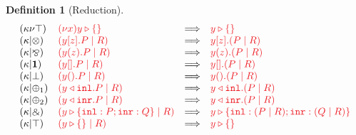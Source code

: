 \documentclass[draft,submission,copyright,creativecommons]{eptcs}
\newtheorem{definition}{Definition}
\begin{document}
\begin{definition}[Reduction]
\[\begin{array}{llcll}
      \hccpRedKappaNuTop
      & \tm{\piNew{x}{\cpAbsurd{y}}}
      & \Longrightarrow
      & \tm{\cpAbsurd{y}}
      \\
      \hccpRedKappaMixTens
      & \tm{(\piPar{\piBoundSend{y}{z}{P}}{R})}
      & \Longrightarrow
      & \tm{\piBoundSend{y}{z}{(\piPar{P}{R})}}
      \\
      \hccpRedKappaMixParr
      & \tm{(\piPar{\piRecv{y}{z}{P}}{R})}
      & \Longrightarrow
      & \tm{\piRecv{y}{z}{(\piPar{P}{R})}}
      \\
      \hccpRedKappaMixOne
      & \tm{(\piPar{\piBoundSend{y}{}{P}}{R})}
      & \Longrightarrow
      & \tm{\piBoundSend{y}{}{(\piPar{P}{R})}}
      \\
      \hccpRedKappaMixBot
      & \tm{(\piPar{\piRecv{y}{}{P}}{R})}
      & \Longrightarrow
      & \tm{\piRecv{y}{}{(\piPar{P}{R})}}
      \\
      \hccpRedKappaMixPlus1
      & \tm{(\piPar{\cpInl{y}{P}}{R})}
      & \Longrightarrow
      & \tm{\cpInl{y}{(\piPar{P}{R})}}
      \\
      \hccpRedKappaMixPlus2
      & \tm{(\piPar{\cpInr{y}{P}}{R})}
      & \Longrightarrow
      & \tm{\cpInr{y}{(\piPar{P}{R})}}
      \\
      \hccpRedKappaMixWith
      & \tm{(\piPar{\cpCase{y}{P}{Q}}{R})}
      & \Longrightarrow
      & \tm{\cpCase{y}{(\piPar{P}{R})}{(\piPar{Q}{R})}}
      \\
      \hccpRedKappaMixTop
      & \tm{(\piPar{\cpAbsurd{y}}{R})}
      & \Longrightarrow
      & \tm{\cpAbsurd{y}}
    \end{array}
  \]
  \begin{center}
    \begin{prooftree*}
      \SYM{\hccpRedGammaNew}
    \end{prooftree*}
    \begin{prooftree*}
      \SYM{\hccpRedGammaMix}
    \end{prooftree*}
    \begin{prooftree*}
      \SYM{\hccpRedGammaEquiv}
    \end{prooftree*}
  \end{center}
\end{definition}
\end{document}
